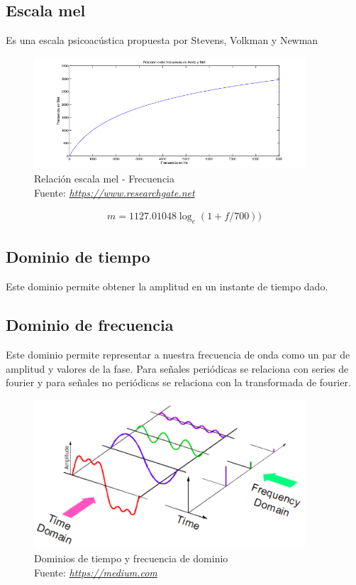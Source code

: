 \subsection{Escala mel}
Es una escala psicoacústica propuesta por Stevens, Volkman y Newman 
\begin{figure}[H]
	\centering
	\includegraphics[width=0.9\textwidth]{Figures/escala_mel.png}
	\caption{Relación escala mel - Frecuencia\\ Fuente:  \href{https://www.researchgate.net/figure/Relacion-entre-frecuencia-en-Hz-eje-x-y-en-escala-Mel-eje-y_fig2_312041038}{\textit{https://www.researchgate.net}}}
	\label{mel}
\end{figure} 
\begin{equation}
	\label{STg}
	\begin{aligned}
	m=1127.01048\log_{e}(1+f/700))
	\end{aligned}
\end{equation}
\subsection{Dominio de tiempo}
Este dominio permite obtener la amplitud en un instante de tiempo dado.
\subsection{Dominio de frecuencia}
Este dominio permite representar a nuestra frecuencia de onda como un par de amplitud y valores de la fase. Para señales periódicas se relaciona con series de fourier y para señales no periódicas se relaciona con la transformada de fourier.
\begin{figure}[H]
	\centering
	\includegraphics[width=0.9\textwidth]{Figures/audio_signal.png}
	\caption{Dominios de tiempo y frecuencia de dominio\\ Fuente:  \href{https://medium.com/@venkateshpnk22/how-to-convert-your-speech-voice-to-text-data-1b2686099260}{\textit{https://medium.com}}}
	\label{onda}
\end{figure} 


